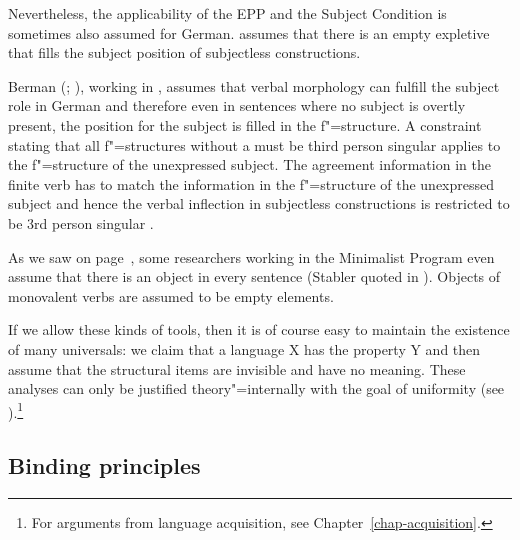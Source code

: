\noindent
Nevertheless, the applicability of the EPP and the Subject Condition is sometimes also assumed for German.
\citet[]{Grewendorf93}
assumes that there is an empty expletive that fills the subject position of subjectless constructions.

Berman (\citeyear[]{Berman99a};
\citeyear[Chapter~4]{Berman2003a}), working in \lfg, assumes that verbal morphology can fulfill the subject role
in German and therefore even in sentences where no subject is overtly present, the position for the subject is filled
in the f"=structure. A constraint stating that all f"=structures without a \predv must be third
person singular applies to the f"=structure of the unexpressed subject. The agreement information in
the finite verb has to match the information in the f"=structure of the unexpressed subject and
hence the verbal inflection in subjectless constructions is restricted to be 3rd person singular \citep{Berman99a}. 

As we saw on page~\pageref{Seite-leeres-Objekt}, some researchers working in the Minimalist Program even
assume that there is an object in every sentence (Stabler quoted in
\citet[, 124]{Veenstra98a}). Objects of monovalent verbs are assumed to be empty
elements.
 
If we allow these kinds of tools, then it is of course easy to maintain the existence of many universals: we claim that a language X has the property Y and then assume that
the structural items are invisible and have no meaning. These analyses can only be justified theory"=internally with the goal of uniformity
(see \citealp[Section~2.1.2]{CJ2005a}).\footnote{%
	For arguments from language acquisition, see Chapter~\ref{chap-acquisition}.
	}

\subsection{Binding principles}

